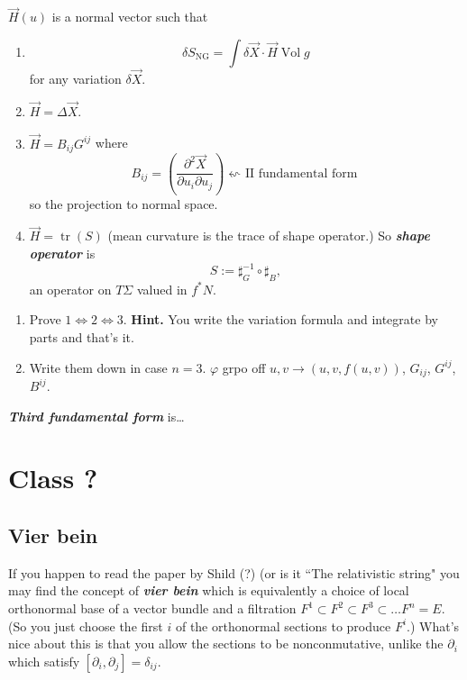 \(\vec{H}(u)\) is a normal vector such that
\begin{enumerate}
\item \[\delta S_{\operatorname{ NG}}=\int \delta \vec{X}\cdot \vec{H}\operatorname{Vol}g\]
for any variation \(\delta \vec{X}\).
\item \(\vec{H}=\Delta \vec{X}\).
\item \(\vec{H} =B_{ij}G^{ij}\)
	where
	\[B_{ij}=\left(\frac{\partial^2 \vec{X}}{\partial u_i\partial u_j}\right) \text{\(\leftsquigarrow \) II fundamental form} \]
	so the projection to normal space.
\item \(\vec{H}=\operatorname{tr}(S)\) (mean curvature is the trace of shape operator.) So \textit{\textbf{shape operator}} is
	 \[S:=\sharp^{-1}_G \circ \sharp_B,\]
	an operator on  \(T \Sigma\) valued in \(f^*N\).
\end{enumerate}

\begin{exercise}\leavevmode
\begin{enumerate}
\item Prove \(1 \iff 2 \iff 3\). \textbf{Hint.}  You write the variation formula and integrate by parts and that's it.
\item Write them down in case \(n=3\). \(\varphi\) grpo off \(u,v \to (u,v,f(u,v))\), \(G_{ij}\), \(G^{ij}\), \(B^{ij}\).
\end{enumerate}\end{exercise}

\begin{defn}\leavevmode
\textit{\textbf{Third fundamental form}} is…
\end{defn}

\section{Class ?}

\subsection{Vier bein}

If you happen to read the paper by Shild (?) (or is it ``The relativistic string" you may find the concept of \textit{\textbf{vier bein}} which is equivalently a choice of local orthonormal base of a vector bundle and a filtration \(F^1\subset F^2 \subset F^3 \subset\ldots F^n = E\). (So you just choose the first \(i\) of the orthonormal sections to produce \(F^i\).) What's nice about this is that you allow the sections to be nonconmutative, unlike the \(\partial_i\) which satisfy \([\partial_i,\partial_j]=\delta_{ij}\).

